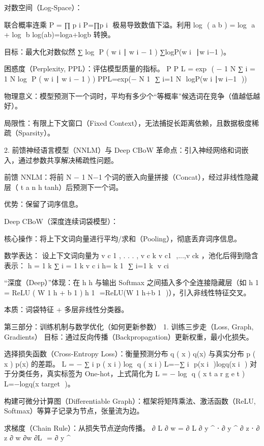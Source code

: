 对数空间（Log-Space）：

联合概率连乘 
P
=
∏
p
i
P=∏p 
i
​
  极易导致数值下溢。利用 
log
⁡
(
a
b
)
=
log
⁡
a
+
log
⁡
b
log(ab)=loga+logb 转换。

目标：最大化对数似然 
∑
log
⁡
P
(
w
i
∣
w
i
−
1
)
∑logP(w 
i
​
 ∣w 
i−1
​
 )。

困惑度（Perplexity, PPL）：评估模型质量的指标。
P
P
L
=
exp
⁡
(
−
1
N
∑
i
=
1
N
log
⁡
P
(
w
i
∣
w
i
−
1
)
)
PPL=exp(− 
N
1
​
 ∑ 
i=1
N
​
 logP(w 
i
​
 ∣w 
i−1
​
 ))

物理意义：模型预测下一个词时，平均有多少个“等概率”候选词在竞争（值越低越好）。

局限性：有限上下文窗口（Fixed Context），无法捕捉长距离依赖，且数据极度稀疏（Sparsity）。

2. 前馈神经语言模型（NNLM）与 Deep CBoW
革命点：引入神经网络和词嵌入，通过参数共享解决稀疏性问题。

前馈 NNLM：将前 
N
−
1
N−1 个词的嵌入向量拼接（Concat），经过非线性隐藏层（
t
a
n
h
tanh）后预测下一个词。

优势：保留了词序信息。

Deep CBoW（深度连续词袋模型）：

核心操作：将上下文词向量进行平均/求和（Pooling），彻底丢弃词序信息。

数学表达：
设上下文词向量为 
v
c
1
,
.
.
.
,
v
c
k
v 
c1
​
 ,...,v 
ck
​
 ，池化后得到隐含表示：
h
=
1
k
∑
i
=
1
k
v
c
i
h= 
k
1
​
 ∑ 
i=1
k
​
 v 
ci
​
 

“深度（Deep）”体现：在 
h
h 与输出 Softmax 之间插入多个全连接隐藏层（如 
h
1
=
ReLU
(
W
1
h
+
b
1
)
h 
1
​
 =ReLU(W 
1
​
 h+b 
1
​
 )），引入非线性特征交叉。

本质：词袋特征 + 多层非线性分类器。

第三部分：训练机制与数学优化（如何更新参数）
1. 训练三步走（Loss, Graph, Gradients）
目标：通过反向传播（Backpropagation）更新权重，最小化损失。

选择损失函数（Cross-Entropy Loss）：衡量预测分布 
q
(
x
)
q(x) 与真实分布 
p
(
x
)
p(x) 的差距。
L
=
−
∑
i
p
(
x
i
)
log
⁡
q
(
x
i
)
L=−∑ 
i
​
 p(x 
i
​
 )logq(x 
i
​
 )
对于分类任务，真实标签为 One-hot，上式简化为 
L
=
−
log
⁡
q
(
x
t
a
r
g
e
t
)
L=−logq(x 
target
​
 )。

构建可微分计算图（Differentiable Graph）：框架将矩阵乘法、激活函数（ReLU, Softmax）等算子记录为节点，张量流为边。

求梯度（Chain Rule）：从损失节点逆向传播。
∂
L
∂
w
=
∂
L
∂
y
^
⋅
∂
y
^
∂
z
⋅
∂
z
∂
w
∂w
∂L
​
 = 
∂ 
y
^
​
 
